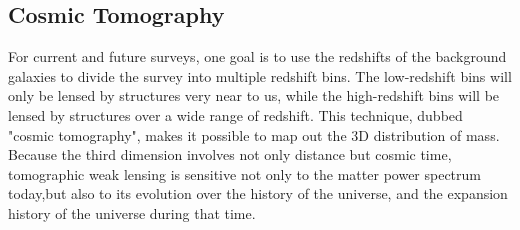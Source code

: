 \subsection{Cosmic Tomography}
For current and future surveys, one goal is to use the redshifts of the background galaxies to divide the survey into multiple redshift bins. The low-redshift bins will only be lensed by structures very near to us, while the high-redshift bins will be lensed by structures over a wide range of redshift. This technique, dubbed "cosmic tomography", makes it possible to map out the 3D distribution of mass. Because the third dimension involves not only distance but cosmic time, tomographic weak lensing is sensitive not only to the matter power spectrum today,but also to its evolution over the history of the universe, and the expansion history of the universe during that time.
\cite{lensingbook} \cite{rachel_2018} \cite{hoekstra}
